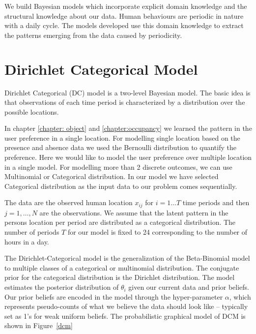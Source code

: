 We build Bayesian models which incorporate explicit domain knowledge and the structural knowledge about our data. Human behaviours are periodic in nature with a daily cycle. The models developed use this domain knowledge to extract the patterns emerging from the data caused by periodicity.


\section{Dirichlet Categorical Model }

Dirichlet Categorical (DC) model  is a two-level Bayesian model. The basic idea is that observations of each time period is characterized by a distribution over the possible locations.

In chapter \ref{chapter: object} and \ref{chapter:occupancy} we learned the pattern in the user preference in a single location. For modelling single location based on the presence and absence data we used the Bernoulli distribution to quantify the preference. Here we would like to model the user preference over multiple location in a single model. For modelling more than 2 discrete outcomes, we can use Multinomial or Categorical distribution. In our model we have selected Categorical distribution as the input data to our problem comes sequentially. 

The data are the observed human location $x_{ij}$ for $i = 1 \dots T$ time periods and then $j = 1, \dots , N$  are the observations.  We assume that the latent pattern in the persons location per period are distributed as a categorical distribution. The number of periods $T$ for our model is fixed to 24 corresponding to the number of hours in a day. 

The Dirichlet-Categorical model is the generalization of the Beta-Binomial model to multiple classes of a categorical or multinomial distribution. The conjugate prior for the categorical distribution is the Dirichlet distribution. The model estimates the posterior distribution of $\theta_i$ given our current data and prior beliefs. Our prior beliefs are encoded in the model through the hyper-parameter $\alpha$, which represents pseudo-counts of what we believe the data should look like – typically set as 1's for weak uniform beliefs. The probabilistic graphical model of  DCM is shown in Figure~\ref{dcm}

